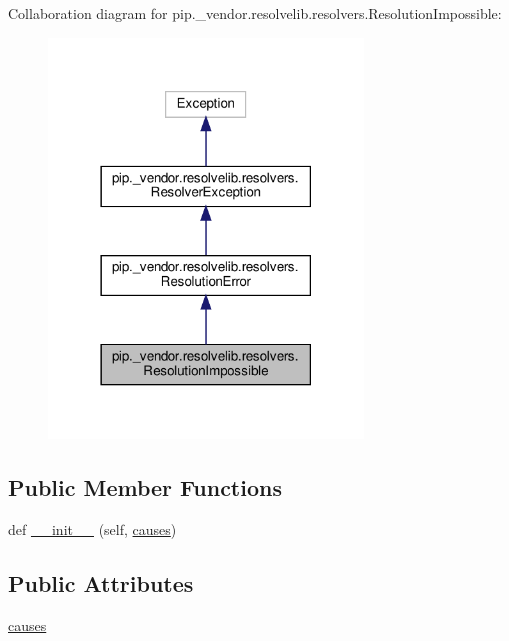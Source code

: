 Collaboration diagram for pip.\+\_\+vendor.\+resolvelib.\+resolvers.\+Resolution\+Impossible\+:
\nopagebreak
\begin{figure}[H]
\begin{center}
\leavevmode
\includegraphics[width=237pt]{classpip_1_1__vendor_1_1resolvelib_1_1resolvers_1_1ResolutionImpossible__coll__graph}
\end{center}
\end{figure}
\subsection*{Public Member Functions}
\begin{DoxyCompactItemize}
\item 
def \hyperlink{classpip_1_1__vendor_1_1resolvelib_1_1resolvers_1_1ResolutionImpossible_a4eb535e81e9afe87f58e00aa48a2ce25}{\+\_\+\+\_\+init\+\_\+\+\_\+} (self, \hyperlink{classpip_1_1__vendor_1_1resolvelib_1_1resolvers_1_1ResolutionImpossible_a58a530831938b0fa4aeaa64498d6e44e}{causes})
\end{DoxyCompactItemize}
\subsection*{Public Attributes}
\begin{DoxyCompactItemize}
\item 
\hyperlink{classpip_1_1__vendor_1_1resolvelib_1_1resolvers_1_1ResolutionImpossible_a58a530831938b0fa4aeaa64498d6e44e}{causes}
\end{DoxyCompactItemize}


